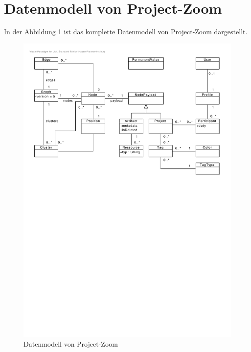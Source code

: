 \section{Datenmodell von Project-Zoom}
In der Abbildung \ref{fig:complete-model} ist das komplette Datenmodell von Project-Zoom dargestellt.
\begin{figure}[h!t]
  \centering     
  \includegraphics[width=1.0\textwidth]{img/complete_model.pdf}  
   \caption{Datenmodell von Project-Zoom}
  \label{fig:complete-model} 
\end{figure}
\pagebreak
